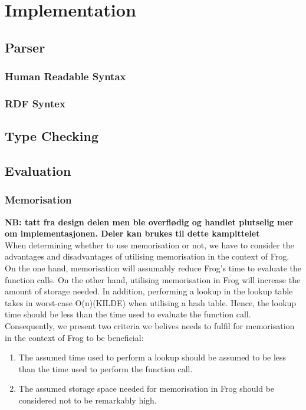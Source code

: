 
\chapter{Implementation}

\section{Parser}
\label{parser}
\subsection{Human Readable Syntax}
\label{implHRS}
\subsection{RDF Syntex}
\label{implRDF}

\section{Type Checking}

\section{Evaluation}
\label{implementation_evaluation}

\subsection{Memorisation}
\textbf{NB: tatt fra design delen men ble overflødig og handlet plutselig mer om implementasjonen. Deler kan brukes til dette kampittelet}
\\
When determining whether to use memorisation or not, we have to consider the advantages and disadvantages of utilising memorisation in the context of Frog. On the one hand, memorisation will assumably reduce Frog's time to evaluate the function calls. On the other hand, utilising memorisation in Frog will increase the amount of storage needed. In addition, performing a lookup in the lookup table takes in worst-case O(n)(KILDE) when utilising a hash table. Hence, the lookup time should be less than the time used to evaluate the function call. Consequently, we present two criteria we belives needs to fulfil for memorisation in the context of Frog to be beneficial:
\begin{enumerate}
    \item The assumed time used to perform a lookup should be assumed to be less than the time used to perform the function call.
    \item The assumed storage space needed for memorisation in Frog should be considered not to be remarkably high. 
\end{enumerate}


